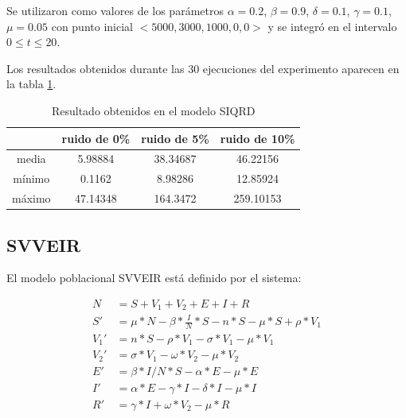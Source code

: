 Se utilizaron como valores de los parámetros $\alpha = 0.2$, $\beta = 0.9$, $\delta = 0.1$, $\gamma = 0.1$, $\mu = 0.05$ con punto inicial $<5000, 3000, 1000, 0, 0>$ y se integró en el intervalo $0 \leq t \leq 20$.

Los resultados obtenidos durante las 30 ejecuciones del experimento aparecen en la tabla \ref{table:experiment_SIQRD}.

\begin{table}[!h]
    \centering
    \caption{Resultado obtenidos en el modelo SIQRD}
    \begin{tabular}{|c|c|c|c|}
        \hline
               & \textbf{ruido de 0\%} & \textbf{ruido de 5\%} & \textbf{ruido de 10\%} \\
        \hline
        media  & 5.98884               & 38.34687              & 46.22156               \\
        \hline
        mínimo & 0.1162                & 8.98286               & 12.85924               \\
        \hline
        máximo & 47.14348              & 164.3472              & 259.10153              \\
        \hline
    \end{tabular}
    \label{table:experiment_SIQRD}
\end{table}


\subsection{SVVEIR}

El modelo poblacional SVVEIR está definido por el sistema:

\begin{align*}
    N    & = S + V_1 + V_2 + E + I + R                                        \\
    S'   & = \mu * N - \beta * \frac{I}{N} * S - n * S - \mu * S + \rho * V_1 \\
    V_1' & = n * S - \rho * V_1 - \sigma * V_1 - \mu * V_1                    \\
    V_2' & = \sigma * V_1 - \omega * V_2 - \mu * V_2                          \\
    E'   & = \beta * I / N * S - \alpha * E - \mu * E                         \\
    I'   & = \alpha * E - \gamma * I - \delta * I - \mu * I                   \\
    R'   & = \gamma * I + \omega * V_2 - \mu * R
\end{align*}

